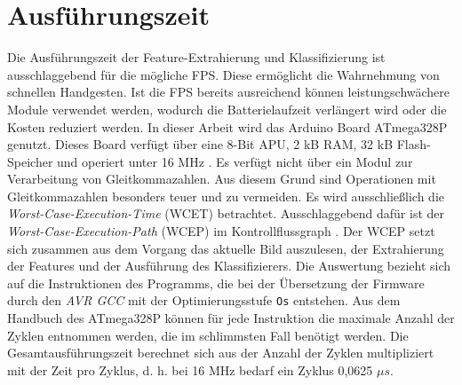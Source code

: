 \section{Ausführungszeit}
\label{sec:eval_speed}
Die Ausführungszeit der Feature-Extrahierung und Klassifizierung ist ausschlaggebend für die mögliche FPS. Diese ermöglicht die Wahrnehmung von schnellen Handgesten. Ist die FPS bereits ausreichend
können leistungschwächere Module verwendet werden, wodurch die Batterielaufzeit verlängert wird oder die Kosten reduziert werden.
\newline
\newline
In dieser Arbeit wird das Arduino Board ATmega328P genutzt. Dieses Board verfügt über eine 8-Bit APU, 2 kB RAM, 32 kB Flash-Speicher und operiert unter 16 MHz \cite{atmega328p}.
Es verfügt nicht über ein Modul zur Verarbeitung von Gleitkommazahlen. Aus diesem Grund sind Operationen mit Gleitkommazahlen besonders teuer und zu vermeiden.
\newline
\newline
Es wird ausschließlich die \textit{Worst-Case-Execution-Time} (WCET) betrachtet. Ausschlaggebend dafür ist der \textit{Worst-Case-Execution-Path} (WCEP) im Kontrollflussgraph \cite{wcc_intro}. Der WCEP
setzt sich zusammen aus dem Vorgang das aktuelle Bild auszulesen, der Extrahierung der Features und der Ausführung des Klassifizierers.
\newline
\newline
Die Auswertung bezieht sich auf die Instruktionen des Programms, die bei der Übersetzung der Firmware durch den \textit{AVR GCC} mit der Optimierungsstufe \texttt{Os} entstehen. Aus dem Handbuch des
ATmega328P \cite{atmega328p} können für jede Instruktion die maximale Anzahl der Zyklen entnommen werden, die im schlimmsten Fall benötigt werden. Die Gesamtausführungszeit berechnet sich aus der Anzahl der Zyklen
multipliziert mit der Zeit pro Zyklus, d. h. bei 16 MHz bedarf ein Zyklus 0,0625 $\mu s$.



